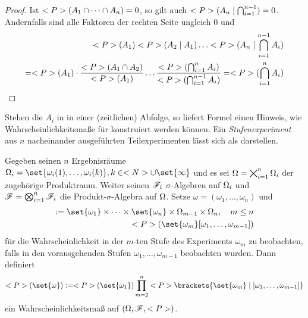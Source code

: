 \begin{proof}
	Ist $\P(A_1 \cap \dots \cap A_n) = 0$, so gilt auch $\P(A_n \mid \bigcap_{i=1}^{n-1}) = 0$. Andernfalls sind alle Faktoren der rechten Seite ungleich 0 und
	\begin{align*}
		\P(A_1)\P(A_2 \mid A_1) \dots \P(A_n \mid \bigcap_{i=1}^{n-1} A_i) \\
		= \P(A_1) \cdot \frac{\P(A_1 \cap A_2)}{\P(A_1)} \dots \frac{\P(\bigcap_{i=1}^{n} A_i)}{\P(\bigcap_{i=1}^{n-1}A_i)} = \P(\bigcap_{i=1}^n A_i)	
	\end{align*}
\end{proof} %
Stehen die $A_i$ in  in einer (zeitlichen) Abfolge, so liefert Formel einen Hinweis, wie Wahrscheinlichkeitsmaße für  konstruiert werden können. Ein \emph{Stufenexperiment} aus $n$ nacheinander ausgeführten Teilexperimenten lässt sich als  darstellen.

\begin{center}
	\begin{tikzpicture}
		
	\end{tikzpicture} 
\end{center}

\begin{proposition}
	Gegeben seinen $n$ Ergebnisräume $\O_i = \set{\omega_i (1), \dots, \omega_i (k)}, k \in \N \cup \set{\infty}$ und es sei $\O = \bigtimes_{i = 1}^n \O_i$ der zugehörige Produktraum. Weiter seinen $\F_i$ $\sigma$-Algebren auf $\O_i$ und $\F = \bigotimes_{i=1}^n \F_i$ die Produkt-$\sigma$-Algebra auf $\O$. Setze $\omega = (\omega_1,\dots,\omega_n)$ und
	\begin{align*}
		[\omega_1,\dots,\omega_n]:= \set{\omega_1}\times \dots \times \set{\omega_n} \times \O_{m-1} \times \O_{n},\quad m\le n\\
		\P(\set{\omega_m}[\omega_1,\dots,\omega_{m-1}])
	\end{align*} %
	für die Wahrscheinlichkeit in der $m$-ten Stufe des Experiments $\omega_m$ zu beobachten, falls in den vorausgehenden Stufen $\omega_1,\dots,\omega_{m-1}$ beobachten wurden. Dann definiert
	\begin{align*}
		\P(\set{\omega}) := \P(\set{\omega_1})\prod_{m=2}^{n}\P\brackets{\set{\omega_m} \mid [\omega_1, \dots, \omega_{m-1}]}
	\end{align*}
	ein Wahrscheinlichkeitsmaß auf $(\O, \F, \P)$.
\end{proposition}

